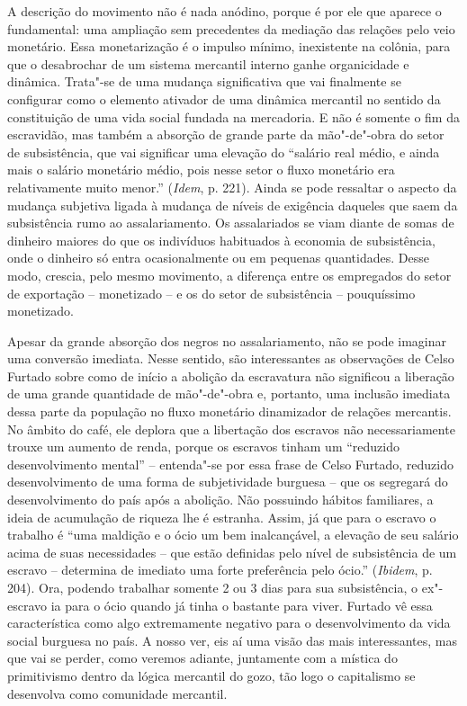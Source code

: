 A descrição do movimento não é nada anódino, porque é por ele que
aparece o fundamental: uma ampliação sem precedentes da mediação das
relações pelo veio monetário. Essa monetarização é o impulso mínimo,
inexistente na colônia, para que o desabrochar de um sistema mercantil
interno ganhe organicidade e dinâmica. Trata"-se de uma mudança
significativa que vai finalmente se configurar como o elemento ativador
de uma dinâmica mercantil no sentido da constituição de uma vida social
fundada na mercadoria. E não é somente o fim da escravidão, mas também a
absorção de grande parte da mão"-de"-obra do setor de subsistência, que
vai significar uma elevação do ``salário real médio, e ainda mais o
salário monetário médio, pois nesse setor o fluxo monetário era
relativamente muito menor.'' (\emph{Idem}, p. 221). Ainda se pode
ressaltar o aspecto da mudança subjetiva ligada à mudança de níveis de
exigência daqueles que saem da subsistência rumo ao assalariamento. Os
assalariados se viam diante de somas de dinheiro maiores do que os
indivíduos habituados à economia de subsistência, onde o dinheiro só
entra ocasionalmente ou em pequenas quantidades. Desse modo, crescia,
pelo mesmo movimento, a diferença entre os empregados do setor de
exportação -- monetizado -- e os do setor de subsistência -- pouquíssimo
monetizado.

Apesar da grande absorção dos negros no assalariamento, não se pode
imaginar uma conversão imediata. Nesse sentido, são interessantes as
observações de Celso Furtado sobre como de início a abolição da
escravatura não significou a liberação de uma grande quantidade de
mão"-de"-obra e, portanto, uma inclusão imediata dessa parte da população
no fluxo monetário dinamizador de relações mercantis. No âmbito do café,
ele deplora que a libertação dos escravos não necessariamente trouxe um
aumento de renda, porque os escravos tinham um ``reduzido
desenvolvimento mental'' -- entenda"-se por essa frase de Celso Furtado,
reduzido desenvolvimento de uma forma de subjetividade burguesa -- que
os segregará do desenvolvimento do país após a abolição. Não possuindo
hábitos familiares, a ideia de acumulação de riqueza lhe é estranha.
Assim, já que para o escravo o trabalho é ``uma maldição e o ócio um bem
inalcançável, a elevação de seu salário acima de suas necessidades --
que estão definidas pelo nível de subsistência de um escravo --
determina de imediato uma forte preferência pelo ócio.'' (\emph{Ibidem},
p. 204). Ora, podendo trabalhar somente 2 ou 3 dias para sua
subsistência, o ex"-escravo ia para o ócio quando já tinha o bastante
para viver. Furtado vê essa característica como algo extremamente
negativo para o desenvolvimento da vida social burguesa no país. A nosso
ver, eis aí uma visão das mais interessantes, mas que vai se perder,
como veremos adiante, juntamente com a mística do primitivismo dentro da
lógica mercantil do gozo, tão logo o capitalismo se desenvolva como
comunidade mercantil.

